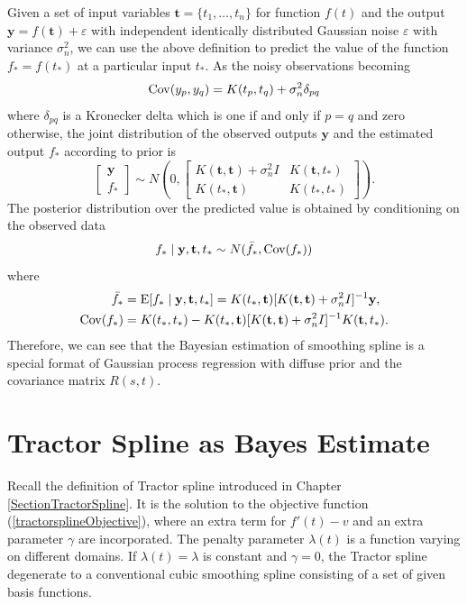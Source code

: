 Given a set of input variables $\mathbf{t} = \{t_1,\ldots,t_n\}$ for function $f(t)$ and the output $\mathbf{y}=f(\mathbf{t})+\varepsilon$ with independent identically distributed Gaussian noise $\varepsilon$ with variance $\sigma_n^2$,  we can use the above definition to predict the value of the function $f_*=f(t_*)$ at a particular input $t_*$. As the noisy observations becoming
\begin{equation*} %
\Cov (y_p,y_q) = K(t_p,t_q)+\sigma_n^2 \delta_{pq}
\end{equation*}
where $\delta_{pq}$ is a Kronecker delta which is one if and only if $p=q$ and zero otherwise, the joint distribution of the observed outputs $\mathbf{y}$ and the estimated output $f_*$ according to prior is
\begin{equation}
\begin{bmatrix}
\mathbf{y}\\
f_*
\end{bmatrix} \sim N \left(  
0,  \begin{bmatrix}
K(\mathbf{t},\mathbf{t}) +\sigma_n^2I& K(\mathbf{t},t_*) \\
K(t_*,\mathbf{t}) & K(t_*,t_*)
\end{bmatrix} 
\right).
\end{equation}
The posterior distribution over the predicted value is obtained by conditioning on the observed data
\begin{equation*}
f_* \mid  \mathbf{y},\mathbf{t},t_* \sim N(\bar{f_*},\mathrm{Cov} (f_*))
\end{equation*}
where 
\begin{align}
\bar{f_*}&=\mathrm{E} [f_* \mid  \mathbf{y},\mathbf{t},t_* ]=K(t_*,\mathbf{t})[K(\mathbf{t},\mathbf{t})+\sigma_n^2I]^{-1}\mathbf{y},\\
\mathrm{Cov}(f_*)&=K(t_*,t_*)-K(t_*,\mathbf{t})[K(\mathbf{t},\mathbf{t})+\sigma_n^2I]^{-1}K(\mathbf{t},t_*).
\end{align}
Therefore, we can see that the Bayesian estimation of smoothing spline is a special format of Gaussian process regression with diffuse prior and the covariance matrix $R(s,t)$. 





\section{Tractor Spline as Bayes Estimate}


Recall the definition of Tractor spline introduced in Chapter \ref{SectionTractorSpline}. It is the solution to the objective function (\ref{tractorsplineObjective}), where an extra term for $f'(t)-v$ and an extra parameter $\gamma$ are incorporated. The penalty parameter $\lambda(t)$ is a function varying on different domains. If $\lambda(t)=\lambda$ is constant and $\gamma=0$, the Tractor spline degenerate to a conventional cubic smoothing spline consisting of a set of given basis functions.  

